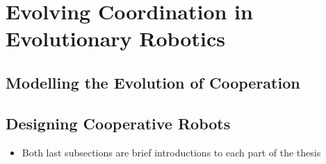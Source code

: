 \section{Evolving Coordination in Evolutionary Robotics}
  
  \subsection{Modelling the Evolution of Cooperation}

  \subsection{Designing Cooperative Robots}
    \begin{itemize}
      \item{Both last subsections are brief introductions to each part of the thesis}
    \end{itemize}
